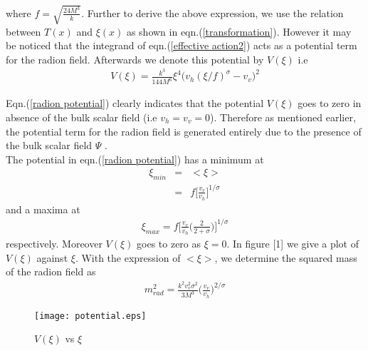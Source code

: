 \documentclass[a4paper]{article}
\begin{document}
where $f=\sqrt{\frac{24M^3}{k}}$. Further to derive the above expression, we use the relation between $T(x)$ and $\xi(x)$ 
as shown in eqn.(\ref{transformation}). However it may be noticed that the integrand of eqn.(\ref{effective action2}) acts 
as a potential term for the radion field. Afterwards we denote this potential by $V(\xi)$ i.e
\begin{eqnarray}
 V(\xi) = \frac{k^3}{144M^6}\xi^4\bigg(v_h(\xi/f)^{\sigma} - v_v\bigg)^2
 \label{radion potential}
\end{eqnarray}

Eqn.(\ref{radion potential}) clearly indicates that the potential $V(\xi)$ goes to zero in absence of the bulk scalar field 
(i.e $v_h=v_v=0$). Therefore as mentioned earlier, the potential term for the radion field is generated entirely due to the presence 
of the bulk scalar field $\Psi$ \cite{GW,GW_radion}.\\
The potential in eqn.(\ref{radion potential}) has a minimum at
\begin{eqnarray}
 \xi_{min}&=&<\xi>\nonumber\\
 &=&f\bigg[\frac{v_v}{v_h}\bigg]^{1/\sigma}
 \label{minima}
\end{eqnarray}
and a maxima at
\begin{eqnarray}
 \xi_{max} = f\bigg[\frac{v_v}{v_h}\bigg(\frac{2}{2+\sigma}\bigg)\bigg]^{1/\sigma}
 \label{maxima}
\end{eqnarray}
respectively. Moreover $V(\xi)$ goes to zero as $\xi=0$. In figure [1] we give a plot of $V(\xi)$ against $\xi$. With the expression of 
$<\xi>$, we determine the squared mass of the radion field as
\begin{eqnarray}
 m_{rad}^2 = \frac{k^2v_v^2\sigma^2}{3M^3}\bigg(\frac{v_v}{v_h}\bigg)^{2/\sigma}
 \label{radion_mass}
\end{eqnarray}


\begin{figure}[!h]
\begin{center}
 \centering
 \texttt{[image: potential.eps]}
 \caption{$V(\xi)$ vs $\xi$}
 \label{plot alpha vs brane separation}
\end{center}
\end{figure}
\end{document}
